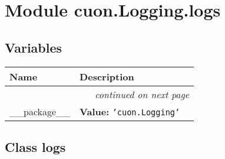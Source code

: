 %
%
%


\section{Module cuon.Logging.logs}

    \label{cuon:Logging:logs}


  \subsection{Variables}

    \vspace{-1cm}
\hspace{\varindent}\begin{longtable}{|p{\varnamewidth}|p{\vardescrwidth}|l}
\cline{1-2}
\cline{1-2} \centering \textbf{Name} & \centering \textbf{Description}& \\
\cline{1-2}
\endhead\cline{1-2}\multicolumn{3}{r}{\small\textit{continued on next page}}\\\endfoot\cline{1-2}
\endlastfoot\raggedright \_\-\_\-p\-a\-c\-k\-a\-g\-e\-\_\-\_\- & \raggedright \textbf{Value:} 
{\tt \texttt{'}\texttt{cuon.Logging}\texttt{'}}&\\
\cline{1-2}
\end{longtable}



\subsection{Class logs}

